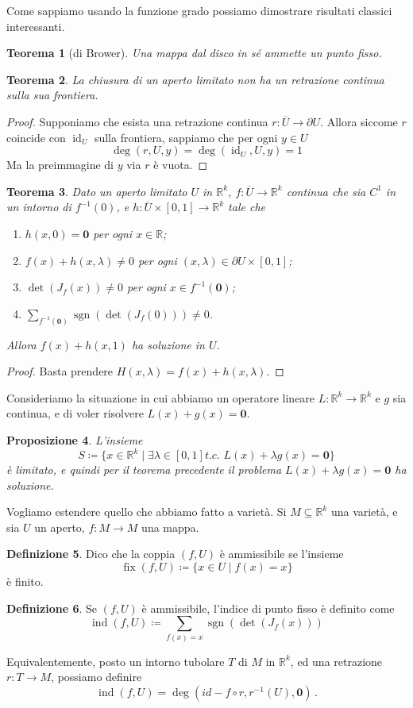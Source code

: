 \documentclass[a4paper, 11pt]{article}
\theoremstyle{definition}
\newtheorem{Def}{Definizione}
\theoremstyle{plain}
\newtheorem{Prop}[Def]{Proposizione}
\newtheorem{Teo}[Def]{Teorema}
\newcommand{\zero}{\mathbf{0}}
\newcommand{\R}{\mathbb{R}}
\newcommand{\cl}[1]{\overline{#1}}
\newcommand{\deff}{\coloneqq}
\DeclareMathOperator{\sgn}{sgn}
\DeclareMathOperator{\id}{id}
\DeclareMathOperator{\ind}{ind}
\DeclareMathOperator{\fix}{fix}
\begin{document}
Come sappiamo usando la funzione grado possiamo dimostrare risultati classici interessanti.
\begin{Teo}[di Brower]
	Una mappa dal disco in sé ammette un punto fisso.
\end{Teo}
\begin{Teo}
	La chiusura di un aperto limitato non ha un retrazione continua sulla sua frontiera.
\end{Teo}
\begin{proof}
	Supponiamo che esista una retrazione continua $r \colon \cl{U} \to \partial U$. Allora siccome $r$ coincide con $\id_U$ sulla frontiera, sappiamo che per ogni $y \in U$
	\[
		\deg(r,U,y) = \deg(\id_U, U,y) = 1
	\]
	Ma la preimmagine di $y$ via $r$ è vuota.
\end{proof}
\begin{Teo}
	Dato un aperto limitato $U$ in $\R^k$,  $f \colon \cl{U} \to \R^k$ continua che sia $C^1$ in un intorno di $f^{-1}(0)$, e $ h \colon \cl{U} \times [0,1] \to \R^k$ tale che 
	\begin{enumerate}
		\item $h(x,0) = \zero$ per ogni $x \in \R$;
		\item $f(x) + h(x, \lambda) \neq 0$ per ogni $(x,\lambda) \in \partial U \times [0,1]$;
		\item $\det(J_f(x)) \neq 0$ per ogni $x \in f^{-1}(\zero)$;
		\item $\sum_{f^{-1}(\zero)}\sgn(\det(J_f(0))) \neq 0$.
	\end{enumerate}
	Allora $f(x) + h(x,1)$ ha soluzione in $U$.
\end{Teo}
\begin{proof}
	Basta prendere $H(x,\lambda) = f(x) + h(x,\lambda)$.
\end{proof}

Consideriamo la situazione in cui abbiamo un operatore lineare $L\colon \R^k \to \R^k$ e $g$ sia continua, e di voler risolvere $L(x) + g(x) = \zero$. 
\begin{Prop}
	L'insieme
	\[
		S \deff \{x \in \R^k \mid \exists \lambda \in [0,1] \textit{t.c. } L(x) + \lambda g(x) = \zero \}
	\]
	è limitato, e quindi per il teorema precedente il problema $L(x) +\lambda g(x) = \zero$ ha soluzione.
\end{Prop}

Vogliamo estendere quello che abbiamo fatto a varietà. Si $M \subseteq \R^k$ una varietà, e sia $U$ un aperto, $f \colon M \to M$ una mappa.
\begin{Def}
	Dico che la coppia $(f,U)$ è ammissibile se l'insieme
	\[
		\fix(f,U) \deff \{x \in U \mid f(x) = x\}
	\]
	è finito.
\end{Def}
\begin{Def}
	Se $(f,U)$ è ammissibile, l'indice di punto fisso è definito come
	\[
		\ind(f,U) \deff \sum_{f(x) = x}\sgn(\det(J_f(x)))
	\]
\end{Def}
Equivalentemente, posto un intorno tubolare $T$ di $M$ in $\R^k$, ed una retrazione $r \colon T \to M$, possiamo definire
\[
	\ind(f,U) = \deg(id-f \circ r, r^{-1}(U), \zero)\,.
\]
\end{document}
